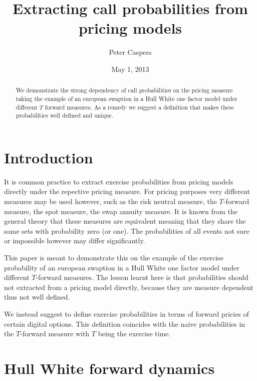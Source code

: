 \documentclass{amsart}
\theoremstyle{plain}
\numberwithin{equation}{section}
\begin{document}


\title[Call Probabilities]{Extracting call probabilities from pricing models}
\author{Peter Caspers}
\date{May 1, 2013}
\begin{abstract}
We demonstrate the strong dependency of call probabilities on the pricing measure taking the example
of an european swaption in a Hull White one factor model under different $T$ forward measures. As a remedy we suggest a definition
that makes these probabilities well defined and unique.
\end{abstract}
\maketitle

\section{Introduction}

It is common practice to extract exercise probabilities from pricing models directly under the repective pricing measure. For pricing purposes
very different measures may be used however, such as the risk neutral measure, the $T$-forward measure,
the spot measure, the swap annuity measure. It is known from the general theory that these measures are equivalent
meaning that they share the same sets with probability zero (or one). The probabilities of all events not sure or impossible
however may differ significantly.

This paper is meant to demonstrate this on the example of the exercise probability of an european swaption in a Hull
White one factor model under different $T$-forward measures. The lesson learnt here is that probabilities should not extracted from a pricing model directly,
because they are measure dependent thus not well defined.

We instead suggest to define exercise probabilities in terms of forward pricies of certain digital options. This definition
coincides with the naive probabilities in the $T$-forward measure with $T$ being the exercise time.

\section{Hull White forward dynamics}
\end{document}
